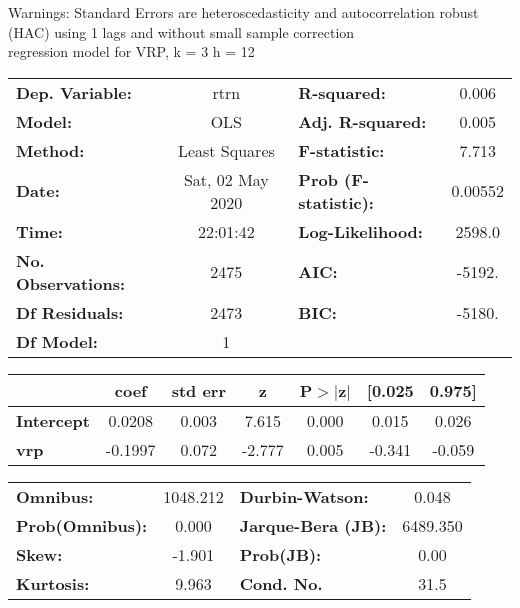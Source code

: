 Warnings: \newline
 [1] Standard Errors are heteroscedasticity and autocorrelation robust (HAC) using 1 lags and without small sample correction\\ 

regression model for VRP, k = 3 h = 12\begin{center}
\begin{tabular}{lclc}
\toprule
\textbf{Dep. Variable:}    &       rtrn       & \textbf{  R-squared:         } &     0.006   \\
\textbf{Model:}            &       OLS        & \textbf{  Adj. R-squared:    } &     0.005   \\
\textbf{Method:}           &  Least Squares   & \textbf{  F-statistic:       } &     7.713   \\
\textbf{Date:}             & Sat, 02 May 2020 & \textbf{  Prob (F-statistic):} &  0.00552    \\
\textbf{Time:}             &     22:01:42     & \textbf{  Log-Likelihood:    } &    2598.0   \\
\textbf{No. Observations:} &        2475      & \textbf{  AIC:               } &    -5192.   \\
\textbf{Df Residuals:}     &        2473      & \textbf{  BIC:               } &    -5180.   \\
\textbf{Df Model:}         &           1      & \textbf{                     } &             \\
\bottomrule
\end{tabular}
\begin{tabular}{lcccccc}
                   & \textbf{coef} & \textbf{std err} & \textbf{z} & \textbf{P$> |$z$|$} & \textbf{[0.025} & \textbf{0.975]}  \\
\midrule
\textbf{Intercept} &       0.0208  &        0.003     &     7.615  &         0.000        &        0.015    &        0.026     \\
\textbf{vrp}       &      -0.1997  &        0.072     &    -2.777  &         0.005        &       -0.341    &       -0.059     \\
\bottomrule
\end{tabular}
\begin{tabular}{lclc}
\textbf{Omnibus:}       & 1048.212 & \textbf{  Durbin-Watson:     } &    0.048  \\
\textbf{Prob(Omnibus):} &   0.000  & \textbf{  Jarque-Bera (JB):  } & 6489.350  \\
\textbf{Skew:}          &  -1.901  & \textbf{  Prob(JB):          } &     0.00  \\
\textbf{Kurtosis:}      &   9.963  & \textbf{  Cond. No.          } &     31.5  \\
\bottomrule
\end{tabular}
\end{center}

